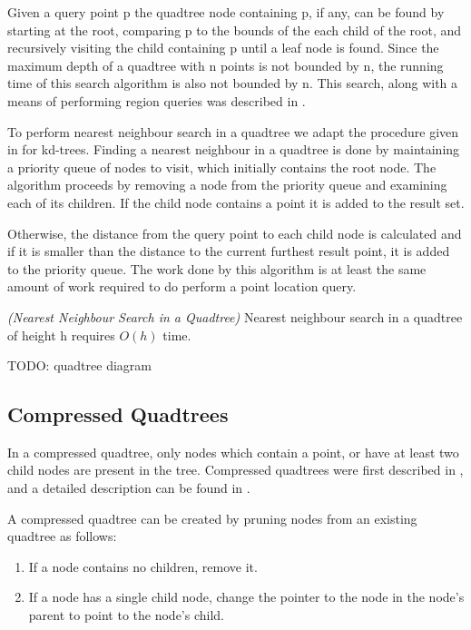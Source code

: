 \documentclass[mcs]{scsthesis}
\begin{document}
Given a query point p the quadtree node containing p, if any, can be found by
starting at the root, comparing p to the bounds of the each child of the root,
and recursively visiting the child containing p until a leaf node is found.  
Since the maximum depth of a quadtree with n points is not bounded by n, the
running time of this search algorithm is also not bounded by n. This search,
along with a means of performing region queries was described in
\cite{quadtree}.

To perform nearest neighbour search in a quadtree we adapt the procedure given
in \cite{samet} for kd-trees. Finding a nearest neighbour in a quadtree is done
by maintaining a priority queue of nodes to visit, which initially contains the
root node. The algorithm proceeds by removing a node from the priority queue and
examining each of its children. If the child node contains a point it is added
to the result set.

Otherwise, the distance from the query point to each child node is calculated
and if it is smaller than the distance to the current furthest result point,
it is added to the priority queue. The work done by this algorithm is at
least the same amount of work required to do perform a point location query.

\begin{thm} \emph{(Nearest Neighbour Search in a Quadtree)} 
Nearest neighbour search in a quadtree of height h requires \(O(h)\) time.
\end{thm}

TODO: quadtree diagram

\subsection{Compressed Quadtrees}

In a compressed quadtree, only nodes which contain a point, or have at least
two child nodes are present in the tree. Compressed quadtrees were first
described in \cite{compressedquadtree}, and a detailed description can be found
in \cite{skipquadtree}.

A compressed quadtree can be created by pruning nodes from an existing quadtree
as follows:

\begin{enumerate}
\item If a node contains no children, remove it.
\item If a node has a single child node, change the pointer to the node in the
node's parent to point to the node's child.
\end{enumerate}
\end{document}
